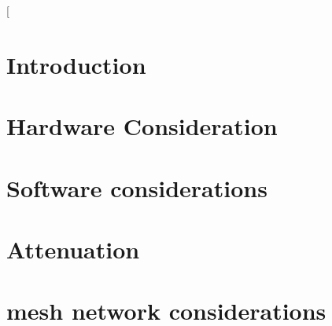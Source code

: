 [%

\section{Introduction}


\section{Hardware Consideration}

\section{Software considerations}

\section{Attenuation}




\section{mesh network considerations}


